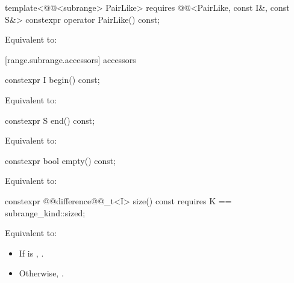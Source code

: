 %
\begin{itemdecl}
template<@@<subrange> PairLike>
  requires @@<PairLike, const I&, const S&>
constexpr operator PairLike() const;
\end{itemdecl}

\begin{itemdescr}
\pnum
\effects Equivalent to: 
\end{itemdescr}

[range.subrange.accessors]{ accessors}

%
\begin{itemdecl}
constexpr I begin() const;
\end{itemdecl}

\begin{itemdescr}
\pnum
\effects Equivalent to: 
\end{itemdescr}

%
\begin{itemdecl}
constexpr S end() const;
\end{itemdecl}

\begin{itemdescr}
\pnum
\effects Equivalent to: 
\end{itemdescr}

%
\begin{itemdecl}
constexpr bool empty() const;
\end{itemdecl}

\begin{itemdescr}
\pnum
\effects Equivalent to: 
\end{itemdescr}

%
\begin{itemdecl}
constexpr @@difference@@_t<I> size() const
  requires K == subrange_kind::sized;
\end{itemdecl}

\begin{itemdescr}
\pnum
\effects Equivalent to: 
\begin{itemize}
\item If  is , .
\item Otherwise, .
\end{itemize}
\end{itemdescr}

